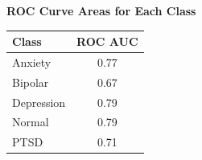 \begin{center}
    \textbf{ROC Curve Areas for Each Class} \\[0.5em]
    \begin{tabular}{|l|c|}
        \hline
        \textbf{Class}  & \textbf{ROC AUC} \\ \hline
        Anxiety         & 0.77            \\ \hline
        Bipolar         & 0.67            \\ \hline
        Depression      & 0.79            \\ \hline
        Normal          & 0.79            \\ \hline
        PTSD            & 0.71            \\ \hline
    \end{tabular}
\end{center}

